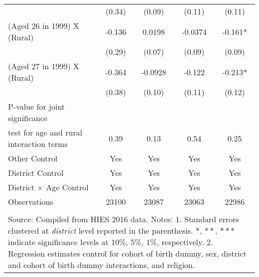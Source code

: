 \begin{table}[h!]
\begin{center}
{{\begin{tabular}{lcccc}
	& (0.34)	& (0.09)	& (0.11)	& (0.11)\\
(Aged 26 in 1999) X (Rural)	& -0.136	& 0.0198	& -0.0374	&-0.161*\\
	& (0.29)	& (0.07)	& (0.09)	& (0.09)\\
(Aged 27 in 1999) X (Rural)	& -0.364	& -0.0928	& -0.122	&-0.213*\\
	& (0.38)	& (0.10)	& (0.11)	& (0.12)\\
\hline
P-value for joint significance	&	&	&	&\\
test for age and rural interaction terms	& 0.39	& 0.13	& 0.54	& 0.25\\
\hline
Other Control	&Yes	&Yes	&Yes	&Yes\\
District Control	&Yes	&Yes	&Yes	&Yes\\
District $\times$ \textnormal{Age Control}	&Yes	&Yes	&Yes	&Yes\\
Observations	&23100	& 23087	& 23063	& 22986\\
\hline
\hline\\
\multicolumn{5}{p{17cm}}{{\footnotesize Source: Compiled from HIES 2016 data.
Notes: 1. Standard errors clustered at \textit{district} level reported in the parenthesis. $*$, $**$, $***$ indicate significance levels at 10\%, 5\%, 1\%, respectively.
2. Regression estimates control for cohort of birth dummy, sex, district and cohort of birth dummy interactions, and religion.}}.
\end{tabular}}}
\end{center}
\end{table}

